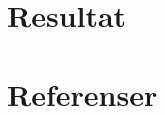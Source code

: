 \documentclass[11pt,a4paper]{article}
\begin{document}
\section{Resultat}\label{setup}

\newpage

\section{Referenser}\label{refs}




\end{document}
